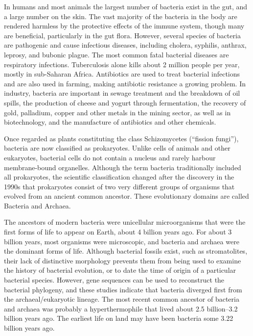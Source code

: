 In humans and most animals the largest number of bacteria exist in the gut, and a large number on the skin. The vast majority of the bacteria in the body are rendered harmless by the protective effects of the immune system, though many are beneficial, particularly in the gut flora. However, several species of bacteria are pathogenic and cause infectious diseases, including cholera, syphilis, anthrax, leprosy, and bubonic plague. The most common fatal bacterial diseases are respiratory infections. Tuberculosis alone kills about 2 million people per year, mostly in sub-Saharan Africa. Antibiotics are used to treat bacterial infections and are also used in farming, making antibiotic resistance a growing problem. In industry, bacteria are important in sewage treatment and the breakdown of oil spills, the production of cheese and yogurt through fermentation, the recovery of gold, palladium, copper and other metals in the mining sector, as well as in biotechnology, and the manufacture of antibiotics and other chemicals.

Once regarded as plants constituting the class Schizomycetes (``fission fungi''), bacteria are now classified as prokaryotes. Unlike cells of animals and other eukaryotes, bacterial cells do not contain a nucleus and rarely harbour membrane-bound organelles. Although the term bacteria traditionally included all prokaryotes, the scientific classification changed after the discovery in the 1990s that prokaryotes consist of two very different groups of organisms that evolved from an ancient common ancestor. These evolutionary domains are called Bacteria and Archaea.

The ancestors of modern bacteria were unicellular microorganisms that were the first forms of life to appear on Earth, about 4 billion years ago. For about 3 billion years, most organisms were microscopic, and bacteria and archaea were the dominant forms of life. Although bacterial fossils exist, such as stromatolites, their lack of distinctive morphology prevents them from being used to examine the history of bacterial evolution, or to date the time of origin of a particular bacterial species. However, gene sequences can be used to reconstruct the bacterial phylogeny, and these studies indicate that bacteria diverged first from the archaeal/eukaryotic lineage. The most recent common ancestor of bacteria and archaea was probably a hyperthermophile that lived about 2.5 billion--3.2 billion years ago. The earliest life on land may have been bacteria some 3.22 billion years ago.

